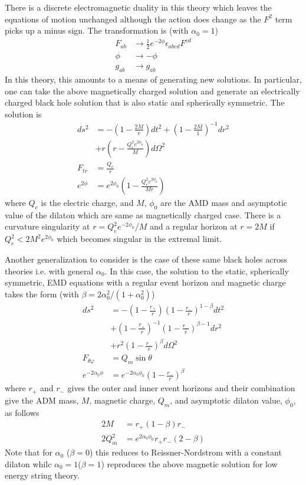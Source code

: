 \documentclass[%
 reprint,
 amsmath,amssymb,
 aps,
]{revtex4-1}
\begin{document}
There is a discrete electromagnetic duality in this theory which leaves the equations of motion unchanged although the action does change as the $F^2$ term picks up a minus sign. The transformation is (with $\alpha_0 = 1$)
\begin{align}
F_{ab} &\rightarrow \frac{1}{2} e^{-2\phi} \epsilon_{abcd} F^{cd} \\
\phi &\rightarrow -\phi \\
g_{ab} &\rightarrow g_{ab}
\end{align}
In this theory, this amounts to a means of generating new solutions. In particular, one can take the above magnetically charged solution and generate an electrically charged black hole solution that is also static and spherically symmetric. The solution is
\begin{align}
ds^2 &= - \left(1 - \frac{2M}{r} \right) dt^2 + \left(1-\frac{2M}{1}\right)^{-1} dr^2 \nonumber \\
&+ r \left(r-\frac{Q_e^2 e^{2 \phi_0}}{M} \right) d\Omega^2 \\
F_{tr} &= \frac{Q_e}{r} \\
e^{2\phi} &= e^{2\phi_0} \left(1-\frac{Q_e^2 e^{2\phi_0}}{Mr} \right)
\end{align}
where $Q_e$ is the electric charge, and $M$, $\phi_0$ are the AMD mass and asymptotic value of the dilaton which are same as magnetically charged case. There is a curvature singularity at $r=Q^2_e e^{-2 \phi_0} /M$ and a regular horizon at $r=2M$ if $Q^2_e < 2 M^2 e^{2\phi_0}$ which becomes singular in the extremal limit.

Another generalization to consider is the case of these same black holes across theories i.e. with general $\alpha_0$. In this case, the solution to the static, spherically symmetric, EMD equations with a regular event horizon and magnetic charge takes the form (with $\beta = 2 \alpha_0^2 /(1+ \alpha_0^2)$) 
\begin{align}
ds^2 &= -\left(1-\frac{r_+}{r} \right) \left(1-\frac{r_-}{r} \right)^{1-\beta} dt^2 \nonumber \\
&+ \left(1-\frac{r_+}{r} \right)^{-1} \left(1-\frac{r_-}{r} \right)^{\beta-1} dr^2 \nonumber \\
&+ r^2 \left(1-\frac{r_-}{r}\right)^\beta d \Omega^2 \\
F_{\theta \varphi} &= Q_m \sin \theta \\
e^{- 2 \alpha_0 \phi} &= e^{-2 \alpha_0 \phi_0} \left(1-\frac{r_-}{r} \right)^\beta
\end{align}
where $r_+$ and $r_-$ gives the outer and inner event horizons and their combination give the ADM mass, $M$, magnetic charge, $Q_m$, and asymptotic dilaton value, $\phi_0$, as follows
\begin{align}
2M &= r_+ (1-\beta)r_- \\
2Q_m^2 &= e^{2\alpha_0 \phi_0} r_+ r_- (2-\beta)
\end{align}
Note that for $\alpha_0$ ($\beta=0$) this reduces to Reissner-Nordstrom with a constant dilaton whilc $\alpha_0=1$($\beta=1$) reproduces the above magnetic solution for low energy string theory.
\end{document}
